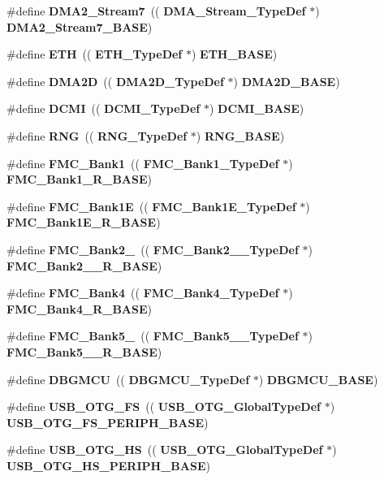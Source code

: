 \begin{DoxyCompactItemize}
\#define \textbf{ D\+M\+A2\+\_\+\+Stream7}~((\textbf{ D\+M\+A\+\_\+\+Stream\+\_\+\+Type\+Def} $\ast$) \textbf{ D\+M\+A2\+\_\+\+Stream7\+\_\+\+B\+A\+SE})
\item 
\#define \textbf{ E\+TH}~((\textbf{ E\+T\+H\+\_\+\+Type\+Def} $\ast$) \textbf{ E\+T\+H\+\_\+\+B\+A\+SE})
\item 
\#define \textbf{ D\+M\+A2D}~((\textbf{ D\+M\+A2\+D\+\_\+\+Type\+Def} $\ast$)\textbf{ D\+M\+A2\+D\+\_\+\+B\+A\+SE})
\item 
\#define \textbf{ D\+C\+MI}~((\textbf{ D\+C\+M\+I\+\_\+\+Type\+Def} $\ast$) \textbf{ D\+C\+M\+I\+\_\+\+B\+A\+SE})
\item 
\#define \textbf{ R\+NG}~((\textbf{ R\+N\+G\+\_\+\+Type\+Def} $\ast$) \textbf{ R\+N\+G\+\_\+\+B\+A\+SE})
\item 
\#define \textbf{ F\+M\+C\+\_\+\+Bank1}~((\textbf{ F\+M\+C\+\_\+\+Bank1\+\_\+\+Type\+Def} $\ast$) \textbf{ F\+M\+C\+\_\+\+Bank1\+\_\+\+R\+\_\+\+B\+A\+SE})
\item 
\#define \textbf{ F\+M\+C\+\_\+\+Bank1E}~((\textbf{ F\+M\+C\+\_\+\+Bank1\+E\+\_\+\+Type\+Def} $\ast$) \textbf{ F\+M\+C\+\_\+\+Bank1\+E\+\_\+\+R\+\_\+\+B\+A\+SE})
\item 
\#define \textbf{ F\+M\+C\+\_\+\+Bank2\+\_}~((\textbf{ F\+M\+C\+\_\+\+Bank2\+\_\+\_\+\+Type\+Def} $\ast$) \textbf{ F\+M\+C\+\_\+\+Bank2\+\_\+\_\+\+R\+\_\+\+B\+A\+SE})
\item 
\#define \textbf{ F\+M\+C\+\_\+\+Bank4}~((\textbf{ F\+M\+C\+\_\+\+Bank4\+\_\+\+Type\+Def} $\ast$) \textbf{ F\+M\+C\+\_\+\+Bank4\+\_\+\+R\+\_\+\+B\+A\+SE})
\item 
\#define \textbf{ F\+M\+C\+\_\+\+Bank5\+\_}~((\textbf{ F\+M\+C\+\_\+\+Bank5\+\_\+\_\+\+Type\+Def} $\ast$) \textbf{ F\+M\+C\+\_\+\+Bank5\+\_\+\_\+\+R\+\_\+\+B\+A\+SE})
\item 
\#define \textbf{ D\+B\+G\+M\+CU}~((\textbf{ D\+B\+G\+M\+C\+U\+\_\+\+Type\+Def} $\ast$) \textbf{ D\+B\+G\+M\+C\+U\+\_\+\+B\+A\+SE})
\item 
\#define \textbf{ U\+S\+B\+\_\+\+O\+T\+G\+\_\+\+FS}~((\textbf{ U\+S\+B\+\_\+\+O\+T\+G\+\_\+\+Global\+Type\+Def} $\ast$) \textbf{ U\+S\+B\+\_\+\+O\+T\+G\+\_\+\+F\+S\+\_\+\+P\+E\+R\+I\+P\+H\+\_\+\+B\+A\+SE})
\item 
\#define \textbf{ U\+S\+B\+\_\+\+O\+T\+G\+\_\+\+HS}~((\textbf{ U\+S\+B\+\_\+\+O\+T\+G\+\_\+\+Global\+Type\+Def} $\ast$) \textbf{ U\+S\+B\+\_\+\+O\+T\+G\+\_\+\+H\+S\+\_\+\+P\+E\+R\+I\+P\+H\+\_\+\+B\+A\+SE})
\end{DoxyCompactItemize}


